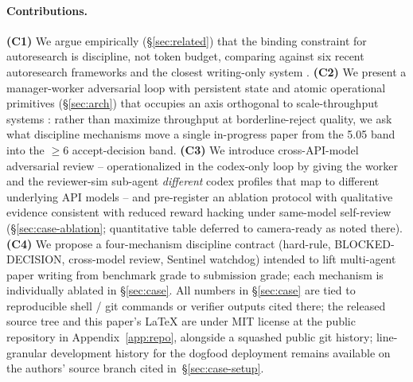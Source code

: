 \paragraph{Contributions.}
\textbf{(C1)} We argue empirically (\S\ref{sec:related}) that the
binding constraint for autoresearch is discipline, not token budget,
comparing against six recent autoresearch frameworks
\citep{lu2024aiscientist,yamada2025aiscientistv2,schmidgall2025agentlaboratory,karpathy2026autoresearch,sibyl2026system,fars2026analemma}
and the closest writing-only system \citep{song2026paperorchestra}.
\textbf{(C2)} We present a manager-worker adversarial loop with
persistent state and atomic operational primitives (\S\ref{sec:arch})
that occupies an axis orthogonal to scale-throughput systems
\citep{fars2026analemma,sibyl2026system}: rather than maximize
throughput at borderline-reject quality, we ask what discipline
mechanisms move a single in-progress paper from the 5.05 band into
the $\geq 6$ accept-decision band.
\textbf{(C3)} We introduce cross-API-model adversarial review --
operationalized in the codex-only loop by giving the worker and the
reviewer-sim sub-agent \emph{different} codex profiles that map to
different underlying API models -- and pre-register an ablation protocol
with qualitative evidence consistent with reduced reward hacking under
same-model self-review (\S\ref{sec:case-ablation}; quantitative table
deferred to camera-ready as noted there).
\textbf{(C4)} We propose a four-mechanism discipline contract
(hard-rule, BLOCKED-DECISION, cross-model review, Sentinel watchdog)
intended to lift multi-agent paper writing from benchmark grade to
submission grade; each mechanism is individually ablated in
\S\ref{sec:case}. All numbers in \S\ref{sec:case} are tied to
reproducible shell / git commands or verifier outputs cited there; the released source tree and this paper's \LaTeX{} are under MIT
license at the public repository in Appendix~\ref{app:repo}, alongside a
squashed public git history; line-granular development history for the
dogfood deployment remains available on the authors' source branch cited
in~\S\ref{sec:case-setup}.
